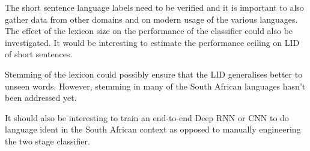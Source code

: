 \documentclass[conference]{IEEEtran}
\begin{document}
The short sentence language labels need to be verified and it is important to also gather data from other domains and on modern usage of the various languages. The effect of the lexicon size on the performance of the classifier could also be investigated. It would be interesting to estimate the performance ceiling on LID of short sentences.

Stemming of the lexicon could possibly ensure that the LID generalises better to unseen words. However, stemming in many of the South African languages hasn't been addressed yet.

It should also be interesting to train an end-to-end Deep RNN or CNN to do language ident in the South African context as opposed to manually engineering the two stage classifier.







\end{document}
